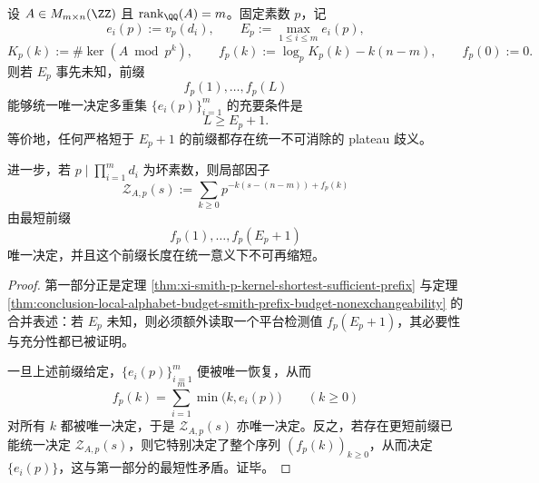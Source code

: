 \begin{theorem}\label{thm:conclusion-smith-plateau-threshold-local-factor-rigidity}
设 \(A\in M_{m\times n}(\ZZ)\) 且 \(\operatorname{rank}_{\QQ}(A)=m\)。固定素数 \(p\)，记
\[
e_i(p):=v_p(d_i),
\qquad
E_p:=\max_{1\le i\le m}e_i(p),
\]
\[
K_p(k):=\#\ker(A\bmod p^k),
\qquad
f_p(k):=\log_p K_p(k)-k(n-m),
\qquad
f_p(0):=0.
\]
则若 \(E_p\) 事先未知，前缀
\[
f_p(1),\dots,f_p(L)
\]
能够统一唯一决定多重集 \(\{e_i(p)\}_{i=1}^{m}\) 的充要条件是
\[
L\ge E_p+1.
\]
等价地，任何严格短于 \(E_p+1\) 的前缀都存在统一不可消除的 plateau 歧义。

进一步，若 \(p\mid\prod_{i=1}^{m}d_i\) 为坏素数，则局部因子
\[
\mathcal Z_{A,p}(s):=\sum_{k\ge 0}p^{-k(s-(n-m))+f_p(k)}
\]
由最短前缀
\[
f_p(1),\dots,f_p(E_p+1)
\]
唯一决定，并且这个前缀长度在统一意义下不可再缩短。
\end{theorem}
\begin{proof}
第一部分正是定理 \ref{thm:xi-smith-p-kernel-shortest-sufficient-prefix} 与定理 \ref{thm:conclusion-local-alphabet-budget-smith-prefix-budget-nonexchangeability} 的合并表述：若 \(E_p\) 未知，则必须额外读取一个平台检测值 \(f_p(E_p+1)\)，其必要性与充分性都已被证明。

一旦上述前缀给定，\(\{e_i(p)\}_{i=1}^{m}\) 便被唯一恢复，从而
\[
f_p(k)=\sum_{i=1}^{m}\min\bigl(k,e_i(p)\bigr)
\qquad(k\ge 0)
\]
对所有 \(k\) 都被唯一决定，于是 \(\mathcal Z_{A,p}(s)\) 亦唯一决定。反之，若存在更短前缀已能统一决定 \(\mathcal Z_{A,p}(s)\)，则它特别决定了整个序列 \((f_p(k))_{k\ge 0}\)，从而决定 \(\{e_i(p)\}\)，这与第一部分的最短性矛盾。证毕。
\end{proof}

